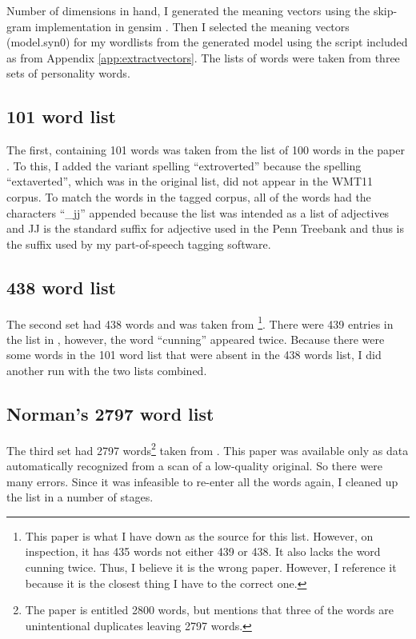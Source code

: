 Number of dimensions in hand, I generated the meaning vectors using the 
skip-gram implementation in gensim \citep{Rehurek2010}. Then I selected the 
meaning vectors (model.syn0) for my wordlists from the generated model using 
the script included as  from Appendix
\ref{app:extractvectors}. The lists of words were taken from three sets of 
personality words. 

\subsection{101 word list}

The first, containing 101 words was taken from the list of 100 words in the 
paper \citep{Goldberg1990}. To this, I added the variant spelling ``extroverted'' 
because the spelling ``extaverted'', which was in the original list, did not 
appear in the WMT11 corpus. To match the words in the tagged corpus, all of the 
words had the characters ``\_jj'' appended because the list was intended as a 
list of adjectives and JJ is the standard suffix for adjective used in the Penn 
Treebank \citep{Marcus1993} and thus is the suffix used by my 
part-of-speech tagging software.

\subsection{438 word list}

The second set had 438 words and was 
taken from \citep{Saucier1996}\footnote{This paper is what I have down as 
the source for this list. However, on inspection, it has 435 words not either
439 or 438. It also lacks the word cunning twice. Thus, I believe it is the 
wrong paper. However, I reference it because it is the closest thing I have
to the correct one.}. There were 439 
entries in the list in \citep{Saucier1996}, however, the word ``cunning'' 
appeared twice. Because there were some words in the 101 word list that were 
absent in the 438 words list, I did another run with the two lists combined.

\subsection{Norman's 2797 word list}

The third set had 2797 words\footnote{The paper is entitled 2800 words, but 
mentions
that three of the words are unintentional duplicates leaving 2797 words.}
taken from \citep{Norman1967}. This paper
was available only as data automatically recognized from a scan of a low-quality
original. So there were many errors. Since it was infeasible to re-enter all the
words again, I cleaned up the list in a number of stages. 

